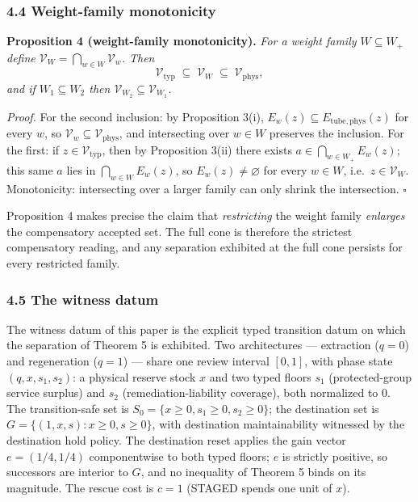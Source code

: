 \documentclass[11pt]{article}
\begin{document}
\subsubsection{4.4 Weight-family
monotonicity}\label{weight-family-monotonicity}

\textbf{Proposition 4 (weight-family monotonicity).} \emph{For a weight
family \(W \subseteq W_+\) define
\(\mathcal{V}_W = \bigcap_{w \in W} \mathcal{V}_w\). Then}
\[\mathcal{V}_{\mathrm{typ}} \;\subseteq\; \mathcal{V}_W \;\subseteq\; \mathcal{V}_{\mathrm{phys}},\]
\emph{and if \(W_1 \subseteq W_2\) then
\(\mathcal{V}_{W_2} \subseteq \mathcal{V}_{W_1}\).}

\emph{Proof.} For the second inclusion: by Proposition 3(i),
\(E_w(z) \subseteq E_{\mathrm{tube,phys}}(z)\) for every \(w\), so
\(\mathcal{V}_w \subseteq \mathcal{V}_{\mathrm{phys}}\), and
intersecting over \(w \in W\) preserves the inclusion. For the first: if
\(z \in \mathcal{V}_{\mathrm{typ}}\), then by Proposition 3(ii) there
exists \(a \in \bigcap_{w \in W_+} E_w(z)\); this same \(a\) lies in
\(\bigcap_{w \in W} E_w(z)\), so \(E_w(z) \neq \varnothing\) for every
\(w \in W\), i.e.~\(z \in \mathcal{V}_W\). Monotonicity: intersecting
over a larger family can only shrink the intersection. \ensuremath{\square}

Proposition 4 makes precise the claim that \emph{restricting} the weight
family \emph{enlarges} the compensatory accepted set. The full cone is
therefore the strictest compensatory reading, and any separation
exhibited at the full cone persists for every restricted family.

\subsubsection{4.5 The witness datum}\label{the-witness-datum}

The witness datum of this paper is the explicit typed transition datum
on which the separation of Theorem 5 is exhibited. Two architectures ---
extraction (\(q = 0\)) and regeneration (\(q = 1\)) --- share one review
interval \([0,1]\), with phase state \((q, x, s_1, s_2)\): a physical
reserve stock \(x\) and two typed floors \(s_1\) (protected-group
service surplus) and \(s_2\) (remediation-liability coverage), both
normalized to \(0\). The transition-safe set is
\(S_0 = \{ x \ge 0, s_1 \ge 0, s_2 \ge 0 \}\); the destination set is
\(G = \{ (1, x, s) : x \ge 0, s \ge 0 \}\), with destination
maintainability witnessed by the destination hold policy. The destination reset applies the gain vector \(e = (1/4, 1/4)\)
componentwise to both typed floors; \(e\) is strictly positive, so successors are interior to \(G\), and no inequality of Theorem 5 binds on its magnitude. The rescue cost is \(c = 1\) (STAGED spends one
unit of \(x\)).
\end{document}
